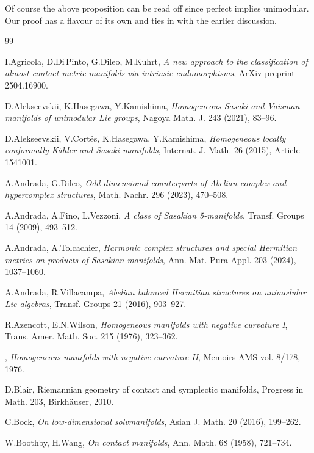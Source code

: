 \documentclass[12pt, twoside]{amsart}
\theoremstyle{definition}
\begin{document}
Of course the above proposition can be read off \cite{Cortes} since perfect implies unimodular. Our proof has a flavour of its own and ties in with the earlier discussion.

\bigbreak 


\begin{thebibliography}{99}

 I.Agricola, D.Di\,Pinto, G.Dileo, M.Kuhrt, \textit{A new approach to the classification of almost contact metric manifolds via intrinsic endomorphisms}, ArXiv preprint 2504.16900.

 D.Alekseevskii, K.Hasegawa, Y.Kamishima, \textit{Homogeneous Sasaki and Vaisman manifolds of unimodular Lie groups}, 
Nagoya Math. J. 243 (2021), 83--96.

 D.Alekseevskii, V.Cort{\'e}s, K.Hasegawa, Y.Kamishima, \textit{Homogeneous locally conformally K{\"a}hler and Sasaki manifolds}, Internat. J. Math. 26 (2015), Article 1541001.

A.Andrada, G.Dileo, \textit{Odd-dimensional counterparts of Abelian complex and hypercomplex structures}, Math. Nachr. 296 (2023), 470--508.

A.Andrada, A.Fino, L.Vezzoni, \textit{A class of Sasakian 5-manifolds}, Transf. Groups 14 (2009), 493--512.

A.Andrada, A.Tolcachier, \textit{Harmonic complex structures and special Hermitian metrics on products of Sasakian manifolds}, Ann. Mat. Pura Appl. 203 (2024), 1037--1060.

A.Andrada, R.Villacampa, \textit{Abelian balanced Hermitian structures on unimodular Lie algebras}, Transf. Groups 21 (2016), 903--927.

 R.Azencott, E.N.Wilson, \textit{Homogeneous manifolds with negative curvature I}, Trans. Amer. Math. Soc. 215 (1976), 323--362.

 \bysame, \textit{Homogeneous manifolds with negative curvature II}, Memoirs AMS vol. 8/178, 1976.

D.Blair, Riemannian geometry of contact and symplectic manifolds, Progress in Math. 203, Birkh{\"a}user, 2010.

 C.Bock, \textit{On low-dimensional solvmanifolds}, Asian J. Math. 20 (2016), 199--262.

W.Boothby, H.Wang, \textit{On contact manifolds}, Ann. Math. 68 (1958), 721--734. 


\end{thebibliography}
\end{document}
